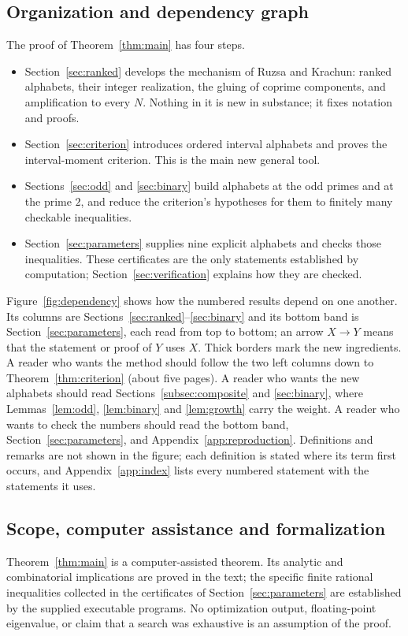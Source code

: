 \documentclass[11pt]{article}
\theoremstyle{definition}
\theoremstyle{remark}
\begin{document}
\subsection{Organization and dependency graph}\label{subsec:roadmap}
The proof of Theorem~\ref{thm:main} has four steps.
\begin{itemize}
\item Section~\ref{sec:ranked} develops the mechanism of Ruzsa and Krachun:
ranked alphabets, their integer realization, the gluing of coprime
components, and amplification to every $N$. Nothing in it is new in
substance; it fixes notation and proofs.
\item Section~\ref{sec:criterion} introduces ordered interval alphabets and
proves the interval-moment criterion. This is the main new general tool.
\item Sections~\ref{sec:odd} and \ref{sec:binary} build alphabets at the odd
primes and at the prime $2$, and reduce the criterion's hypotheses for them to
finitely many checkable inequalities.
\item Section~\ref{sec:parameters} supplies nine explicit alphabets and checks
those inequalities. These certificates are the only statements established by
computation; Section~\ref{sec:verification} explains how they are checked.
\end{itemize}
Figure~\ref{fig:dependency} shows how the numbered results depend on one
another. Its columns are Sections~\ref{sec:ranked}--\ref{sec:binary} and its
bottom band is Section~\ref{sec:parameters}, each read from top to bottom; an
arrow $X\to Y$ means that the statement or proof of $Y$ uses $X$. Thick borders mark
the new ingredients. A reader who wants the method should follow the two left
columns down to Theorem~\ref{thm:criterion} (about five pages). A reader who
wants the new alphabets should read Sections~\ref{subsec:composite} and
\ref{sec:binary}, where Lemmas~\ref{lem:odd}, \ref{lem:binary} and
\ref{lem:growth} carry the weight. A reader who wants to check the numbers
should read the bottom band, Section~\ref{sec:parameters}, and
Appendix~\ref{app:reproduction}. Definitions and remarks are not shown in the
figure; each definition is stated where its term first occurs, and
Appendix~\ref{app:index} lists every numbered statement with the statements it
uses.


\subsection{Scope, computer assistance and formalization}\label{subsec:scope}
Theorem~\ref{thm:main} is a computer-assisted theorem. Its analytic and
combinatorial implications are proved in the text; the specific finite
rational inequalities collected in the certificates of
Section~\ref{sec:parameters} are established by the supplied executable
programs. No optimization output, floating-point eigenvalue, or claim that a
search was exhaustive is an assumption of the proof.
\end{document}
